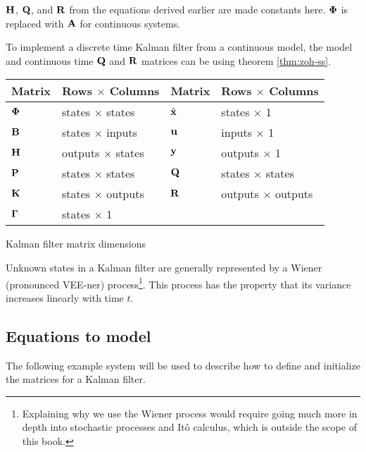 $\mathbf{H}$, $\mathbf{Q}$, and $\mathbf{R}$ from the equations derived earlier are made
constants here. $\mathbf{\Phi}$ is replaced with $\mathbf{A}$ for continuous systems.

\begin{remark}
  To implement a discrete time Kalman filter from a continuous model, the model
  and continuous time $\mathbf{Q}$ and $\mathbf{R}$ matrices can be
   using theorem \ref{thm:zoh-ss}.
\end{remark}

\begin{booktable}
  \begin{tabular}{|ll|ll|}
    \hline
    \rowcolor{headingbg}
    \textbf{Matrix} & \textbf{Rows $\times$ Columns} &
    \textbf{Matrix} & \textbf{Rows $\times$ Columns} \\
    \hline
    $\mathbf{\Phi}$ & states $\times$ states & $\hat{\mathbf{x}}$ & states $\times$ 1
      \\
    $\mathbf{B}$ & states $\times$ inputs & $\mathbf{u}$ & inputs $\times$ 1 \\
    $\mathbf{H}$ & outputs $\times$ states & $\mathbf{y}$ & outputs $\times$ 1 \\
    $\mathbf{P}$ & states $\times$ states & $\mathbf{Q}$ & states $\times$ states \\
    $\mathbf{K}$ & states $\times$ outputs & $\mathbf{R}$ & outputs $\times$ outputs
      \\
    $\mathbf{\Gamma}$ & states $\times$ 1 &  &  \\
    \hline
  \end{tabular}
  \caption{Kalman filter matrix dimensions}
  \label{tab:kf_matrix_dims}
\end{booktable}

Unknown \glspl{state} in a Kalman filter are generally represented by a Wiener
(pronounced VEE-ner) process\footnote{Explaining why we use the Wiener process
would require going much more in depth into stochastic processes and It\^{o}
calculus, which is outside the scope of this book.}. This process has the
property that its variance increases linearly with time $t$.

\subsection{Equations to model}

The following example \gls{system} will be used to describe how to define and
initialize the matrices for a Kalman filter.

